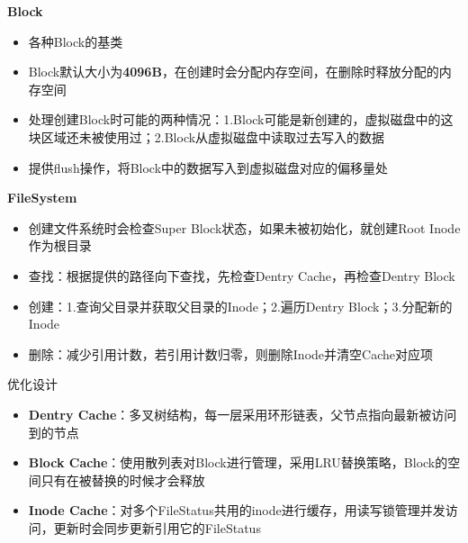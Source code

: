 \documentclass{beamer}
\begin{document}
\begin{frame}{总体架构}

\begin{figure}[htpb]
    \centering
    \texttt{[image: pic/\{img.drawio]}.png}
    \caption{总体架构}
\end{figure}

\end{frame}

\begin{frame}{\textbf{Block}}
\begin{itemize}[<+-| alert@+>]
    \item 各种Block的基类
    \item Block默认大小为\textbf{4096B}，在创建时会分配内存空间，在删除时释放分配的内存空间
    \item 处理创建Block时可能的两种情况：1.Block可能是新创建的，虚拟磁盘中的这块区域还未被使用过；2.Block从虚拟磁盘中读取过去写入的数据
    \item 提供flush操作，将Block中的数据写入到虚拟磁盘对应的偏移量处
\end{itemize}
\end{frame}

\begin{frame}{\textbf{FileSystem}}
\begin{itemize}[<+-| alert@+>]
    \item 创建文件系统时会检查Super Block状态，如果未被初始化，就创建Root Inode作为根目录
    \item 查找：根据提供的路径向下查找，先检查Dentry Cache，再检查Dentry Block
    \item 创建：1.查询父目录并获取父目录的Inode；2.遍历Dentry Block；3.分配新的Inode
    \item 删除：减少引用计数，若引用计数归零，则删除Inode并清空Cache对应项
\end{itemize}
\end{frame}

\begin{frame}{优化设计}
\begin{itemize}[<+-| alert@+>]
    \item \textbf{Dentry Cache}：多叉树结构，每一层采用环形链表，父节点指向最新被访问到的节点
    \item \textbf{Block Cache}：使用散列表对Block进行管理，采用LRU替换策略，Block的空间只有在被替换的时候才会释放
    \item \textbf{Inode Cache}：对多个FileStatus共用的inode进行缓存，用读写锁管理并发访问，更新时会同步更新引用它的FileStatus
\end{itemize}
\end{frame}
\end{document}
